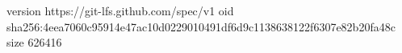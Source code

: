 version https://git-lfs.github.com/spec/v1
oid sha256:4eea7060c95914e47ac10d0229010491df6d9c1138638122f6307e82b20fa48c
size 626416
